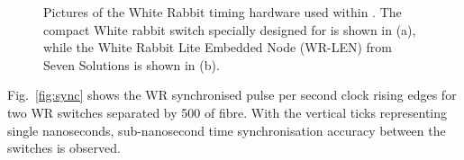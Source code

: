 \begin{figure} %
    \centering
    \quad
    \caption[Pictures of the White Rabbit timing hardware used within \chipsfive]
    {Pictures of the White Rabbit timing hardware used within \chipsfive. The compact White rabbit
        switch  specially designed for \chips is shown in (a), while the White Rabbit Lite
        Embedded Node (WR-LEN) from Seven Solutions is shown in (b).}
    \label{fig:wr_electronics}
\end{figure}

Fig.~\ref{fig:sync} shows the WR synchronised pulse per second clock rising edges for two
\chipsfive WR switches separated by \unit{500}{} of fibre. With the vertical ticks
representing single nanoseconds, sub-nanosecond time synchronisation accuracy between the switches
is observed.

